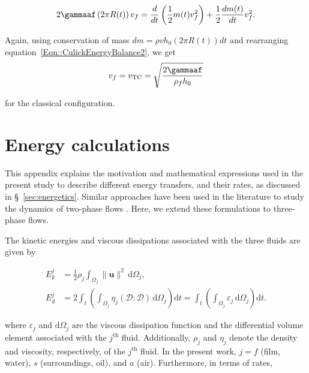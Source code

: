 \begin{subappendices}
	\begin{align}
		2\gammaaf\left(2\pi R(t)\right)v_f = \frac{d}{dt}\left(\frac{1}{2}m(t)v_f^2\right) + \frac{1}{2}\frac{dm(t)}{dt}v_f^2.
		\label{Eqn::CulickEnergyBalance2}
	\end{align}
	
	\noindent Again, using conservation of mass $dm = \rho vh_0\left(2\pi R(t)\right)dt$ and rearranging equation~\eqref{Eqn::CulickEnergyBalance2}, we get
	\begin{align}
		v_f = v_{\text{TC}} = \sqrt{\frac{2\gammaaf}{\rho_f h_{0}}}
		\label{Eqn::TC-velocity-classical App}
	\end{align}
	
	\noindent for the classical configuration. 
	
	\section{Energy calculations}\label{App::EnergyBalance}
	This appendix explains the motivation and mathematical expressions used in the present study to describe different energy transfers, and their rates, as discussed in \S~\ref{sec:energetics}. Similar approaches have been used in the literature to study the dynamics of two-phase flows \citep{sanjay_lohse_jalaal_2021, bohr2021surface}. Here, we extend these formulations to three-phase flows.  
	
	The kinetic energies and viscous dissipations associated with the three fluids are given by \citep[p.~50-51]{landau2013course}
	
	\begin{align}
		\label{Eqn::Ek}
		E_k^j &= \frac{1}{2}\rho_j\int_{\Omega_j}\|\boldsymbol{u}\|^2\,\mathrm{d}\Omega_j,\\
		\label{Eqn::Ed}
		E_d^j &= 2\int_t\left(\int_{\Omega_j}\eta_j\left(\boldsymbol{\mathcal{D}}:\boldsymbol{\mathcal{D}}\right)\,\mathrm{d}\Omega_j\right)\mathrm{d}t = \int_t\left(\int_{\Omega_j}\varepsilon_j\,\mathrm{d}\Omega_j\right)\mathrm{d}t.
	\end{align}
	
	\noindent where $\varepsilon_j$ and $\mathrm{d}\Omega_j$ are the viscous dissipation function and the differential volume element associated with the $j^{\text{th}}$ fluid. Additionally, $\rho_j$ and $\eta_j$ denote the density and viscosity, respectively, of the $j^{\text{th}}$ fluid. In the present work,  $j = f$ (film, water), $s$ (surroundings, oil), and $a$ (air). Furthermore, in terms of rates, 
	

\end{subappendices}
